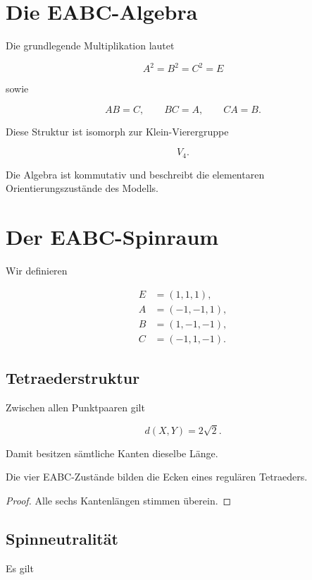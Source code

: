 \documentclass[11pt,a4paper]{article}
\begin{document}
	\section{Die EABC-Algebra}
	
	Die grundlegende Multiplikation lautet
	
	\[
	A^2=B^2=C^2=E
	\]
	
	sowie
	
	\[
	AB=C,
	\qquad
	BC=A,
	\qquad
	CA=B.
	\]
	
	Diese Struktur ist isomorph zur Klein-Vierergruppe
	
	\[
	V_4.
	\]
	
	Die Algebra ist kommutativ und beschreibt die elementaren
	Orientierungszustände des Modells.
	
	\section{Der EABC-Spinraum}
	
	Wir definieren
	
	\begin{align}
		E &= (1,1,1),\\
		A &= (-1,-1,1),\\
		B &= (1,-1,-1),\\
		C &= (-1,1,-1).
	\end{align}
	
	\subsection{Tetraederstruktur}
	
	Zwischen allen Punktpaaren gilt
	
	\[
	d(X,Y)=2\sqrt2.
	\]
	
	Damit besitzen sämtliche Kanten dieselbe Länge.
	
	\begin{section}
		Die vier EABC-Zustände bilden die Ecken eines regulären Tetraeders.
	\end{section}
	
	\begin{proof}
		Alle sechs Kantenlängen stimmen überein.
	\end{proof}
	
	\subsection{Spinneutralität}
	
	Es gilt
	
\end{document}
